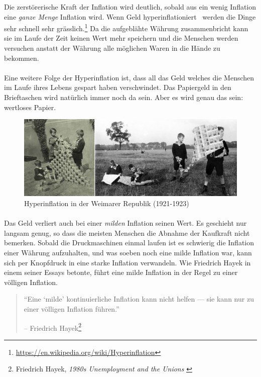 Die zerstörerische Kraft der Inflation wird deutlich, sobald aus ein wenig
Inflation eine \textit{ganze Menge} Inflation wird. Wenn Geld
hyperinflationiert~\cite{wiki:hyperinflation} werden die Dinge sehr schnell sehr
grässlich.\footnote{\url{https://en.wikipedia.org/wiki/Hyperinflation}} Da die
aufgeblähte Währung zusammenbricht kann sie im Laufe der Zeit keinen Wert mehr
speichern und die Menschen werden versuchen anstatt der Währung alle
möglichen Waren in die Hände zu bekommen.

\paragraph{}
Eine weitere Folge der Hyperinflation ist, dass all das Geld welches die
Menschen im Laufe ihres Lebens gespart haben verschwindet. Das Papiergeld in den
Brieftaschen wird natürlich immer noch da sein. Aber es wird genau das sein:
wertloses Papier.

\begin{figure}
  \includegraphics{assets/images/children-playing-with-money.png}
  \caption{Hyperinflation in der Weimarer Republik (1921-1923)}
  \label{fig:children-playing-with-money}
\end{figure}

\paragraph{}
Das Geld verliert auch bei einer \textit{milden} Inflation seinen Wert. Es
geschieht nur langsam genug, so dass die meisten Menschen die Abnahme der
Kaufkraft nicht bemerken. Sobald die Druckmaschinen einmal laufen ist es
schwierig die Inflation einer Währung aufzuhalten, und was soeben noch eine
milde Inflation war, kann sich per Knopfdruck in eine starke Inflation
verwandeln. Wie Friedrich Hayek in einem seiner Essays betonte, führt eine milde
Inflation in der Regel zu einer völligen Inflation.

\begin{quotation}\begin{samepage}
\enquote{Eine \enquote{milde} kontinuierliche Inflation kann nicht helfen — sie
kann nur zu einer völligen Inflation führen.}
\begin{flushright} -- Friedrich Hayek\footnote{Friedrich Hayek, \textit{1980s
Unemployment and the Unions} \cite{hayek-inflation}}
\end{flushright}\end{samepage}\end{quotation}

